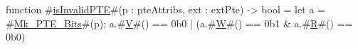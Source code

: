 function #\hyperref[sailRISCVzisInvalidPTE]{isInvalidPTE}#(p : pteAttribs, ext : extPte) -> bool = {
  let a = #\hyperref[sailRISCVzMkzyPTEzyBits]{Mk\_PTE\_Bits}#(p);
  a.#\hyperref[sailRISCVzV]{V}#() == 0b0 | (a.#\hyperref[sailRISCVzW]{W}#() == 0b1 & a.#\hyperref[sailRISCVzR]{R}#() == 0b0)
}
